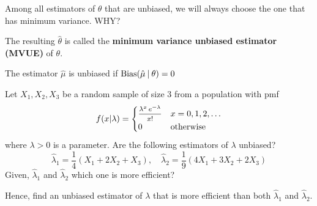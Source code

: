 Among all estimators of $\theta$ that are unbiased, we will always 
choose the one that has minimum variance. WHY? 

The resulting $\hat{\theta}$ is called the \textbf{minimum variance unbiased 
estimator (MVUE)} of $\theta$.

\begin{definition}
    The estimator $\hat{\mu}$ is unbiased if $\operatorname*{Bias}(\hat{\mu} \> | \> \theta) = 0$
\end{definition}

\begin{example}
    Let $X_1, X_2, X_3$ be a random sample of size 3 from a population with pmf 
    \[
        f(x|\lambda) = \begin{cases}
            \mfrac{\lambda^x\, e^{-\lambda}}{x!} & x = 0, 1, 2, \ldots\\
            0 & \text{otherwise}
        \end{cases}
    \]
    where $\lambda > 0$ is a parameter. Are the following estimators of $\lambda$ unbiased?
    \[
        \hat{\lambda}_1 = \frac{1}{4}(X_1 + 2X_2 + X_3), \quad \hat{\lambda}_2 = \frac{1}{9}(4X_1 + 3X_2 + 2X_3) 
    \]
    Given, $\hat{\lambda}_1$ and $\hat{\lambda}_2$ which one is more efficient? 
    
    Hence, find an unbiased estimator of $\lambda$ that is more efficient than both $\hat{\lambda}_1$ and $\hat{\lambda}_2$.
\end{example}
